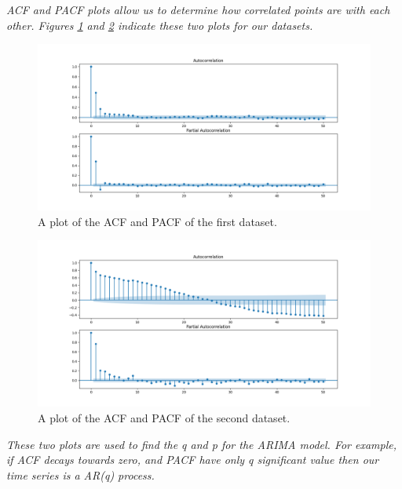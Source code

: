 \textit{\gls{ACF} and \gls{PACF} plots allow us to determine how correlated points are with each other. Figures \ref{fig:Ass1_D1_PACF_ACF} and \ref{fig:Ass1_D2_PACF_ACF} indicate these two plots for our datasets. }



\begin{figure}[H]
    \centering
    \begin{minipage}[b]{1\textwidth}
        \includegraphics[width=\textwidth]{figures/Ass1/Ass1_D1_PACF_ACF.png}
    \end{minipage}
    \caption{A plot of the \gls{ACF} and \gls{PACF} of the first dataset.}
    \label{fig:Ass1_D1_PACF_ACF}
\end{figure}

\begin{figure}[H]
    \centering
    \begin{minipage}[b]{1\textwidth}
        \includegraphics[width=\textwidth]{figures/Ass1/Ass1_D2_PACF_ACF.png}
    \end{minipage}
    \caption{A plot of the \gls{ACF} and \gls{PACF} of the second dataset.}
    \label{fig:Ass1_D2_PACF_ACF}
\end{figure}


\textit{These two plots are used to find the q and p for the ARIMA model. For example, if \gls{ACF} decays towards zero, and \gls{PACF} have only q significant value then our time series is a AR(q) process.}



